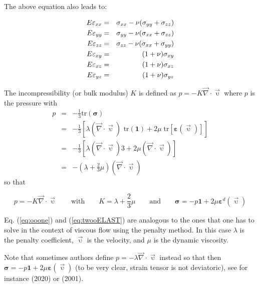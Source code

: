 The above equation also leads to:
\begin{mdframed}[backgroundcolor=blue!5]
\begin{eqnarray}
E \varepsilon_{xx} &=&  \sigma_{xx} - \nu (\sigma_{yy}+\sigma_{zz}) \nonumber\\
E \varepsilon_{yy} &=&  \sigma_{yy} - \nu (\sigma_{xx}+\sigma_{zz}) \nonumber\\
E \varepsilon_{zz} &=&  \sigma_{zz} - \nu (\sigma_{xx}+\sigma_{yy}) \nonumber\\
E \varepsilon_{xy} &=&  (1+\nu) \sigma_{xy} \nonumber\\
E \varepsilon_{xz} &=&  (1+\nu) \sigma_{xz} \nonumber\\
E \varepsilon_{yz} &=&  (1+\nu) \sigma_{yz} \label{eqs:elEe}
\end{eqnarray}
\end{mdframed}

The incompressibility (or bulk modulus) $K$ is defined as $p=-K \vec{\nabla}\cdot\vec{\upupsilon}$ where $p$ is the pressure with 
\begin{eqnarray}
p
&=&-\frac{1}{3} \textrm{tr}({\bm \sigma}) \nonumber\\
&=& -\frac{1}{3} [ \lambda (\vec{\nabla}\cdot\vec{\upupsilon}) 
{\textrm{ tr}}({\bm 1}) 
+ 2 \mu \; \textrm{tr}[{\bm \varepsilon}(\vec{\upupsilon})]] \nonumber\\
 &=& -\frac{1}{3} [ \lambda (\vec{\nabla}\cdot\vec{\upupsilon})  3  + 2 \mu  (\vec{\nabla}\cdot\vec{\upupsilon}) ] \nonumber\\
 &=& -\left( \lambda + \frac{2}{3} \mu \right) (\vec{\nabla}\cdot\vec{\upupsilon})  
\end{eqnarray}
so that 
\begin{mdframed}[backgroundcolor=blue!5]
\[
p=-K \vec{\nabla}\cdot\vec{\upupsilon} 
\qquad
\text{with}
\qquad
K=\lambda+\frac{2}{3}\mu
\qquad
\text{and}
\qquad
{\bm \sigma} = -p {\bm 1} + 2\mu {\bm \varepsilon}^d(\vec\upupsilon)
\]
\end{mdframed}

\begin{remark}
Eq. (\ref{eq:ooone}) and (\ref{eq:twooELAST}) are analogous to the ones that one has to solve in the context of viscous flow using the penalty method. In this case $\lambda$ is the penalty coefficient, $\vec{\upupsilon}$ is the velocity, and $\mu$ is the dynamic viscosity.
\end{remark}

\begin{remark}
Note that sometimes authors define $p=-\lambda  \vec{\nabla}\cdot\vec{\upupsilon}$ instead so that then 
${\bm \sigma} = -p {\bm 1} + 2\mu {\bm \varepsilon}(\vec\upupsilon)$ (to
be very clear, strain tensor is not deviatoric),
see for instance \textcite{samb20} (2020) or \textcite{hala01} (2001).
\end{remark}






